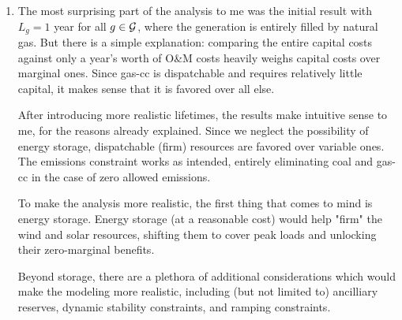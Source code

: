 \documentclass{homework}
\begin{document}
\begin{enumerate}

\item The most surprising part of the analysis to me was the initial result with $L_g = 1$ year
for all $g\in\mathcal{G}$,
where the generation is entirely filled by natural gas. But there is a simple explanation:
comparing the entire capital costs against only a year's worth of O\&M costs heavily weighs
capital costs over marginal ones. Since gas-cc is dispatchable and requires relatively little
capital, it makes sense that it is favored over all else.

After introducing more realistic lifetimes, the results make intuitive sense to me, for
the reasons already explained. Since we neglect the possibility of energy storage, 
dispatchable (firm) resources are favored over variable ones. The emissions constraint
works as intended, entirely eliminating coal and gas-cc in the case of zero allowed emissions.

To make the analysis more realistic, the first thing that comes to mind is energy storage.
Energy storage (at a reasonable cost) would help "firm" the wind and solar resources,
shifting them to cover peak loads and unlocking their zero-marginal benefits.

Beyond storage, there are a plethora of additional considerations which would make the modeling
more realistic, including (but not limited to) ancilliary reserves, dynamic stability constraints,
and ramping constraints.



\end{enumerate}
\end{document}
